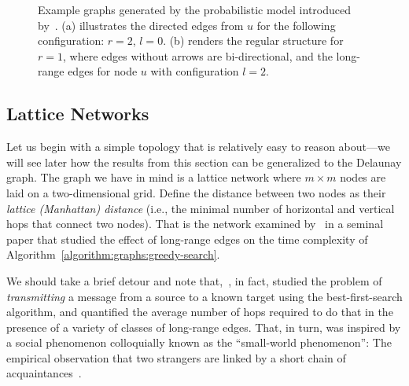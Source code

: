 \begin{figure}[t]
    \centering
    \centering
    \hspace{2em}
    \caption{Example graphs generated by the probabilistic model introduced
    by~\cite{kleinberg2000sw}. (a) illustrates the directed edges from $u$ for
    the following configuration: $r = 2$, $l = 0$. (b) renders the regular
    structure for $r=1$, where edges without arrows are bi-directional,
    and the long-range edges for node $u$ with configuration $l=2$.}
    \label{figure:graphs:lattice}
\end{figure}

\subsection{Lattice Networks}
Let us begin with a simple topology that is relatively easy to reason
about---we will see later how the results from this section can be generalized to the Delaunay graph.
The graph we have in mind is a lattice network where $m \times m$
nodes are laid on a two-dimensional grid.
Define the distance between two nodes as their \emph{lattice (Manhattan) distance}
(i.e., the minimal number of horizontal and vertical hops that connect two nodes).
That is the network examined by~\cite{kleinberg2000sw} in a seminal paper
that studied the effect of long-range edges on the time complexity of
Algorithm~\ref{algorithm:graphs:greedy-search}.

We should take a brief detour and note that,~\cite{kleinberg2000sw},
in fact, studied the problem of \emph{transmitting}
a message from a source to a known target using the best-first-search algorithm,
and quantified the average number
of hops required to do that in the presence of a variety of classes of
long-range edges. That, in turn, was inspired by a social phenomenon
colloquially known as the ``small-world phenomenon'': The empirical observation
that two strangers are linked by a short chain of
acquaintances~\citep{milgram_small-world_1967,travers1969sw}.

